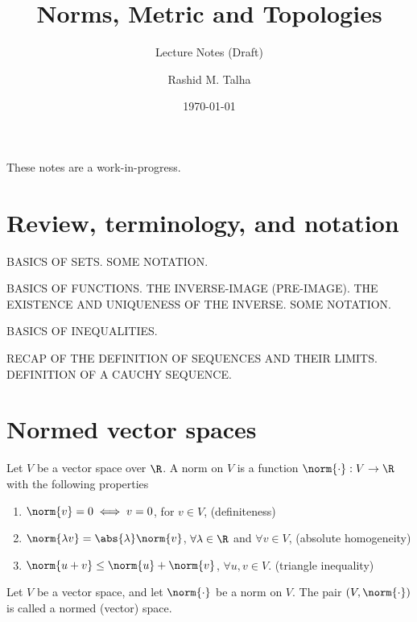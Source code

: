 \documentclass[draft]{penrose}
\title{Norms, Metric and Topologies}
\subtitle{Lecture Notes (Draft)}
\author{Rashid M. Talha}
\affiliation{NUST Mathematics Society}
\date{\today}
\begin{document}
\maketitle
\begin{center}
  These notes are a work-in-progress.
\end{center}


\section{Review, terminology, and notation}
BASICS OF SETS. SOME NOTATION.

BASICS OF FUNCTIONS. THE INVERSE-IMAGE (PRE-IMAGE). THE EXISTENCE AND UNIQUENESS OF THE INVERSE. SOME NOTATION.

BASICS OF INEQUALITIES.

RECAP OF THE DEFINITION OF SEQUENCES AND THEIR LIMITS. DEFINITION OF A CAUCHY SEQUENCE.

\section{Normed vector spaces}
\begin{ndfn}[Norm]
  Let $V$ be a vector space over $\R$. A norm on $V$ is a function $\norm{\cdot}:V\to\R$ with the following properties
  \begin{enumerate}
  \item $\norm{v} = 0 \iff v =0$, for $v \in V$, \hfill (definiteness)
  \item $\norm{\lambda v} = \abs{\lambda}\norm{v}$, $\forall \lambda \in \R$ and $\forall v \in V$, \hfill (absolute homogeneity)
  \item $\norm{u+v} \leq \norm{u} + \norm{v}$, $\forall u,v \in V$. \hfill (triangle inequality)
  \end{enumerate}
\end{ndfn}

\begin{ndfn}
  Let $V$ be a vector space, and let $\norm{\cdot}$ be a norm on $V$. The pair $(V, \norm{\cdot})$ is called a normed (vector) space.
\end{ndfn}
\end{document}
